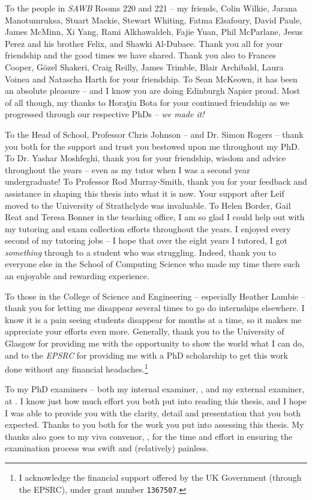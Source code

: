 \begin{preamble}
To the people in \emph{SAWB} Rooms 220 and 221 -- my friends, Colin Wilkie, Jarana Manotumruksa, Stuart Mackie, Stewart Whiting, Fatma Elsafoury, David Paule, James McMinn, Xi Yang, Rami Alkhawaldeh, Fajie Yuan, Phil McParlane, Jesus Perez and his brother Felix, and Shawki Al-Dubaee. Thank you all for your friendship and the good times we have shared. Thank you also to Frances Cooper, G\"{o}zel Shakeri, Craig Reilly, James Trimble, Blair Archibald, Laura Voinea and Natascha Harth for your friendship. To Sean McKeown, it has been an absolute pleasure -- and I know you are doing Edinburgh Napier proud. Most of all though, my thanks to Hora\c{t}iu Bota for your continued friendship as we progressed through our respective PhDs -- \emph{we made it!}

To the Head of School, Professor Chris Johnson -- and Dr. Simon Rogers -- thank you both for the support and trust you bestowed upon me throughout my PhD. To Dr. Yashar Moshfeghi, thank you for your friendship, wisdom and advice throughout the years -- even as my tutor when I was a second year undergraduate! To Professor Rod Murray-Smith, thank you for your feedback and assistance in shaping this thesis into what it is now. Your support after Leif moved to the University of Strathclyde was invaluable. To Helen Border, Gail Reat and Teresa Bonner in the teaching office, I am so glad I could help out with my tutoring and exam collection efforts throughout the years. I enjoyed every second of my tutoring jobs -- I hope that over the eight years I tutored, I got \emph{something} through to a student who was struggling. Indeed, thank you to everyone else in the School of Computing Science who made my time there such an enjoyable and rewarding experience.

To those in the College of Science and Engineering -- especially Heather Lambie -- thank you for letting me disappear several times to go do internships elsewhere. I know it is a pain seeing students disappear for months at a time, so it makes me appreciate your efforts even more. Generally, thank you to the University of Glasgow for providing me with the opportunity to show the world what I can do, and to the \emph{EPSRC} for providing me with a PhD scholarship to get this work done without any financial headaches.\footnote{I acknowledge the financial support offered by the UK Government (through the EPSRC), under grant number \texttt{1367507}.}

To my PhD examiners -- both my internal examiner, , and my external examiner,  at . I know just how much effort you both put into reading this thesis, and I hope I was able to provide you with the clarity, detail and presentation that you both expected. Thanks to you both for the work you put into assessing this thesis. My thanks also goes to my viva convenor, , for the time and effort in ensuring the examination process was swift and (relatively) painless.


\end{preamble}
